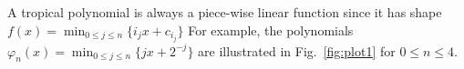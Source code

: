A tropical polynomial is always a piece-wise linear function since it has shape $f(x)=\min_{0\leq j\leq n}\{i_{j}x+c_{i_{j}}\}$
For example, the polynomials $\varphi_{n}(x)=\min_{0\leq j\leq n}\{jx+2^{-j}\}$
are illustrated in Fig.~\ref{fig:plot1} for $0\leq n \leq 4$.

%
%
%
%
%
%
%
%

